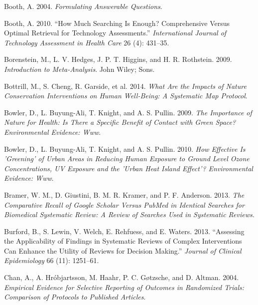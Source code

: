 \documentclass[
  letterpaper,
  DIV=11,
  numbers=noendperiod]{scrreprt}
\newlength{\cslhangindent}
\newenvironment{CSLReferences}[2] %
 {\begin{list}{}{%
  \setlength{\itemindent}{0pt}
  \setlength{\leftmargin}{0pt}
  \setlength{\parsep}{0pt}
  \ifodd #1
   \setlength{\leftmargin}{\cslhangindent}
   \setlength{\itemindent}{-1\cslhangindent}
  \fi
  \setlength{\itemsep}{#2\baselineskip}}}
 {\end{list}}
\begin{document}
\begin{CSLReferences}{1}{1}
Booth, A. 2004. \emph{Formulating Answerable Questions}.

Booth, A. 2010. {``How Much Searching Is Enough? Comprehensive Versus
Optimal Retrieval for Technology Assessments.''} \emph{International
Journal of Technology Assessment in Health Care} 26 (4): 431--35.

Borenstein, M., L. V. Hedges, J. P. T. Higgins, and H. R. Rothstein.
2009. \emph{Introduction to Meta-Analysis}. John Wiley; Sons.

Bottrill, M., S. Cheng, R. Garside, et al. 2014. \emph{What Are the
Impacts of Nature Conservation Interventions on Human Well-Being: A
Systematic Map Protocol}.

Bowler, D., L. Buyung-Ali, T. Knight, and A. S. Pullin. 2009. \emph{The
Importance of Nature for Health: Is There a Specific Benefit of Contact
with Green Space? Environmental Evidence: Www}.

Bowler, D., L. Buyung-Ali, T. Knight, and A. S. Pullin. 2010. \emph{How
Effective Is 'Greening' of Urban Areas in Reducing Human Exposure to
Ground Level Ozone Concentrations, UV Exposure and the 'Urban Heat
Island Effect'? Environmental Evidence: Www}.

Bramer, W. M., D. Giustini, B. M. R. Kramer, and P. F. Anderson. 2013.
\emph{The Comparative Recall of Google Scholar Versus PubMed in
Identical Searches for Biomedical Systematic Review: A Review of
Searches Used in Systematic Reviews}.

Burford, B., S. Lewin, V. Welch, E. Rehfuess, and E. Waters. 2013.
{``Assessing the Applicability of Findings in Systematic Reviews of
Complex Interventions Can Enhance the Utility of Reviews for Decision
Making.''} \emph{Journal of Clinical Epidemiology} 66 (11): 1251--61.

Chan, A., A. Hróbjartsson, M. Haahr, P. C. Gøtzsche, and D. Altman.
2004. \emph{Empirical Evidence for Selective Reporting of Outcomes in
Randomized Trials: Comparison of Protocols to Published Articles}.


\end{CSLReferences}
\end{document}
